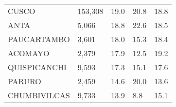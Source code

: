 \begin{tabular}{lllll}
	\cellcolor[HTML]{FF5050}CUSCO                                  & 153,308                                                               & 19.0                                                                             & 20.8                                                                        & 18.8                                                                                \\
	\cellcolor[HTML]{FF5050}ANTA                                   & 5,066                                                                 & 18.8                                                                             & 22.6                                                                        & 18.5                                                                                \\
	\cellcolor[HTML]{FF5050}PAUCARTAMBO                            & 3,601                                                                 & 18.0                                                                             & 15.3                                                                        & 18.4                                                                                \\
	\cellcolor[HTML]{FF5050}ACOMAYO                                & 2,379                                                                 & 17.9                                                                             & 12.5                                                                        & 19.2                                                                                \\
	\cellcolor[HTML]{FF5050}QUISPICANCHI                           & 9,593                                                                 & 17.3                                                                             & 15.1                                                                        & 17.6                                                                                \\
	\cellcolor[HTML]{FF5050}PARURO                                 & 2,459                                                                 & 14.6                                                                             & 20.0                                                                        & 13.6                                                                                \\
	\cellcolor[HTML]{FF5050}CHUMBIVILCAS                           & 9,733                                                                 & 13.9                                                                             & 8.8                                                                         & 15.1                                                                                \\

\end{tabular}
